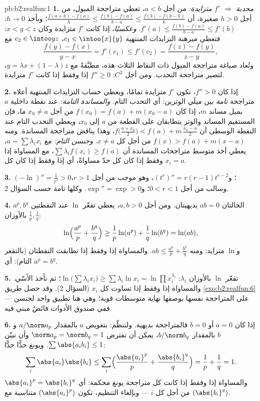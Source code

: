 \begin{solution}{pb:b2:realfun:1}
\textbf{1.} \emph{محدبة $\Rightarrow$ $f'$ متزايدة:} من أجل $a <
b$، تعطي متراجحة الميول، من أجل $h > 0$ صغيرة، أن $\frac{f(a+h)
- f(a)}h \leq \frac{f(b) - f(a)}{b-a} \leq \frac{f(b) -
f(b-h)}{h}$؛ وبأخذ $h \to 0$: $f'(a) \leq \frac{f(b) -
f(a)}{b - a} \leq f'(b)$. \emph{وعكسيًا}، إذا كانت $f'$ متزايدة
وكان $x < y < z$: فتعطي مبرهنة التزايدات المنتهية $c_1 \in
\intoo{x}{y}$، $c_2 \in \intoo yz$ مع
\[
\frac{f(y) - f(x)}{y - x} = f'(c_1) \leq f'(c_2)
= \frac{f(z) - f(y)}{z - y},
\]
وتُعاد صياغة متراجحة الميول ذات النقاط الثلاث هذه، مطبَّقةً مع $y = \lambda
x + (1 - \lambda)z$، لتصير متراجحة التحدب.
ومن أجل $C^2$: $f'' \geq 0$ إذا وفقط إذا كانت $f'$ متزايدة.

\textbf{2.} إذا كان $f'' > 0$، تكون $f'$ متزايدة تمامًا، ويعطي
حساب التزايدات المنتهية أعلاه متراجحة \emph{تامة}
بين ميلَي الوترين: أي التحدب التام. \emph{والمساندة
التامة:} عند نقطة داخلية $a$ بميل مساند $m$، إذا كان $f(x_0) =
f(a) + m(x_0 - a)$ من أجل $x_0 \neq a$ ما، فإن المستقيم المساند والوتر يتطابقان على القطعة
من $a$ إلى $x_0$، ويعطي التحدب التام عند النقطة الوسطى أن $f\bigl(\frac{a +
x_0}2\bigr) < f(a) + m\,\frac{x_0 - a}2$، وهذا يناقض
متراجحة المساندة. ومنه $f(x) > f(a) + m(x - a)$ من أجل كل $x \neq
a$. \emph{وجنسن التام:} مع $a = \sum\lambda_ix_i$، يعطي أخذ متوسط
متراجحات المساندة أن $\sum\lambda_if(x_i) \geq f(a)$،
مع المساواة إذا وفقط إذا كان كل حدّ مساواةً، أي إذا وفقط إذا كان كل $x_i
= a$.

\textbf{3.} $(-\ln)'' = \frac1{t^2} > 0$؛ و$(t^r)'' = r(r -
1)t^{r-2}$، وهو موجب من أجل $r > 1$، وسالب من أجل $0 < r < 1$؛
و$\exp'' = \exp > 0$. وكلها تامة حسب السؤال 2.

\textbf{4.} الحالتان $ab = 0$ بديهيتان. ومن أجل $a, b > 0$،
يعطي تقعّر $\ln$ عند النقطتين $a^p, b^q$ بالأوزان
$\frac1p, \frac1q$:
\[
\ln\Bigl(\frac{a^p}p + \frac{b^q}q\Bigr) \geq
\frac1p\ln(a^p) + \frac1q\ln(b^q) = \ln(ab),
\]
و$\ln$ متزايد: ومنه $ab \leq \frac{a^p}p + \frac{b^q}q$.
والمساواة إذا وفقط إذا تطابقت النقطتان (بالتقعر التام): أي $a^p =
b^q$.

\textbf{5.} تقعّر $\ln$ بالأوزان $\lambda_i$:
$\ln\bigl(\sum\lambda_ix_i\bigr) \geq \sum\lambda_i\ln x_i =
\ln\prod x_i^{\lambda_i}$؛ ثم نأخذ الأسّي. والمساواة إذا وفقط إذا تساوت كل
$x_i$ (السؤال 2). وقد حصل طريق \cref{exo:b2:realfun:6}
على المتراجحة نفسها بوصفها نهاية متوسطات قوية؛ وهي هنا
تطبيق واحد لجنسن --- ففي صندوق الأدوات فائضٌ
مبني فيه.

\textbf{6.} إذا كان $a = 0$ أو $b = 0$ فالمتراجحة بديهية.
ولننظّم: بتعويض $a$ بالمقدار $a/\norm a_p$ و$b$ بالمقدار $b/\norm
b_q$، يمكن أن نفترض $\norm a_p = \norm b_q = 1$ وأن نبيّن
$\sum\abs{a_ib_i} \leq 1$. ويونغ حدًّا حدًّا:
\[
\sum_i\abs{a_i}\abs{b_i} \leq
\sum_i\Bigl(\frac{\abs{a_i}^p}{p} +
\frac{\abs{b_i}^q}{q}\Bigr) = \frac1p + \frac1q = 1 .
\]
والمساواة إذا وفقط إذا كانت كل متراجحة يونغ محكمة: أي $\abs{a_i}^p =
\abs{b_i}^q$ من أجل كل $i$ --- وبإلغاء التنظيم،
تكون $(\abs{a_i}^p)$ متناسبة مع $(\abs{b_i}^q)$.


\end{solution}
